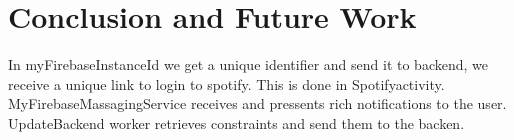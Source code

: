 
\chapter{Conclusion and Future Work} %
\label{Chapter6}
In myFirebaseInstanceId we get a unique identifier and send it to backend, we receive a unique link to login to spotify. This is done in Spotifyactivity. MyFirebaseMassagingService receives and pressents rich notifications to the user. UpdateBackend worker retrieves constraints and send them to the backen.





